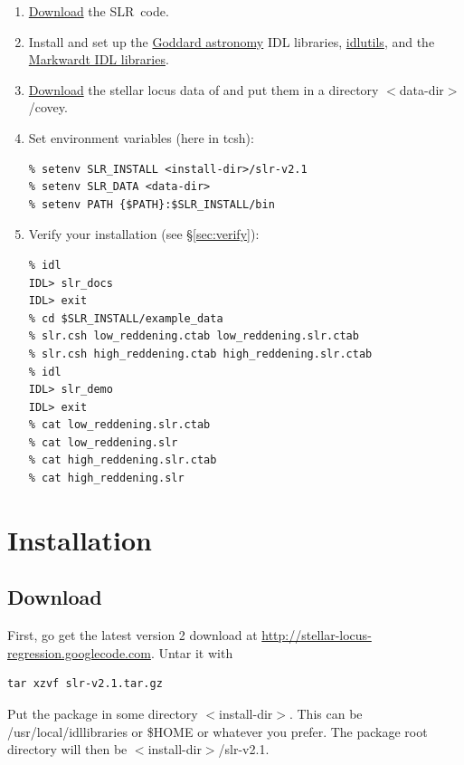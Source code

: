 \documentclass{report}
\newcommand{\slr}{SLR}
\begin{document}
\begin{enumerate}
\item \href{http://stellar-locus-regression.googlecode.com}{Download}
  the \slr\ code.
\item Install and set up the \href{http://idlastro.gsfc.nasa.gov}{Goddard
    astronomy} IDL libraries,
  \href{http://www.astro.princeton.edu/~schlegel/code.html}{idlutils},
  and the \href{http://www.physics.wisc.edu/~craigm/idl}{Markwardt IDL
    libraries}.
\item
  \href{http://www.cfa.harvard.edu/~kcovey/research/medianlocus.tbl}{Download}
  the stellar locus data of \citet{bib:covey} and put them in a
  directory $<$data-dir$>$/covey.
\item Set environment variables (here in tcsh):
\begin{verbatim}
% setenv SLR_INSTALL <install-dir>/slr-v2.1
% setenv SLR_DATA <data-dir>
% setenv PATH {$PATH}:$SLR_INSTALL/bin
\end{verbatim}
\item Verify your installation (see \S\ref{sec:verify}):
\begin{verbatim}
% idl
IDL> slr_docs
IDL> exit
% cd $SLR_INSTALL/example_data
% slr.csh low_reddening.ctab low_reddening.slr.ctab
% slr.csh high_reddening.ctab high_reddening.slr.ctab
% idl
IDL> slr_demo
IDL> exit
% cat low_reddening.slr.ctab
% cat low_reddening.slr
% cat high_reddening.slr.ctab
% cat high_reddening.slr
\end{verbatim}
\end{enumerate}


\chapter{Installation}

\section{Download}

First, go get the latest version 2 download at
\url{http://stellar-locus-regression.googlecode.com}. Untar
it with
\begin{verbatim}
tar xzvf slr-v2.1.tar.gz
\end{verbatim}
Put the package in some directory $<$install-dir$>$. This can be
/usr/local/idllibraries or \$HOME or whatever you prefer. The
package root directory will then be $<$install-dir$>$/slr-v2.1.
\end{document}
